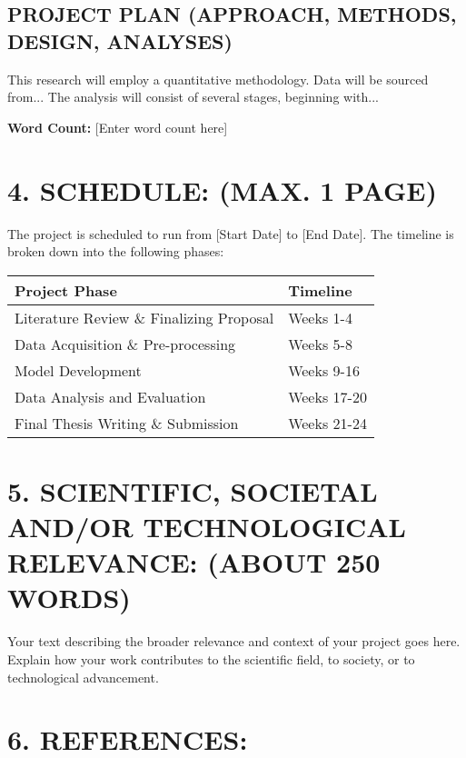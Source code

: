 \documentclass[12pt, a4paper]{article}
\begin{document}
\subsection*{PROJECT PLAN (APPROACH, METHODS, DESIGN, ANALYSES)}
\justifying
This research will employ a quantitative methodology. Data will be sourced from... The analysis will consist of several stages, beginning with...

\vspace{1em}
\noindent\textbf{Word Count:} [Enter word count here]


\section*{4. SCHEDULE: (MAX. 1 PAGE)}
\justifying
The project is scheduled to run from [Start Date] to [End Date]. The timeline is broken down into the following phases:
\begin{center}
    \begin{tabular}{p{} p{}}
        \hline
        \textbf{Project Phase} & \textbf{Timeline} \\
        \hline
        Literature Review \& Finalizing Proposal & Weeks 1-4 \\
        Data Acquisition \& Pre-processing & Weeks 5-8 \\
        Model Development & Weeks 9-16 \\
        Data Analysis and Evaluation & Weeks 17-20 \\
        Final Thesis Writing \& Submission & Weeks 21-24 \\
        \hline
    \end{tabular}
\end{center}


\section*{5. SCIENTIFIC, SOCIETAL AND/OR TECHNOLOGICAL RELEVANCE: (ABOUT 250 WORDS)}
\justifying
Your text describing the broader relevance and context of your project goes here. Explain how your work contributes to the scientific field, to society, or to technological advancement.


\section*{6. REFERENCES:}
\printbibliography[heading=none]
\end{document}
